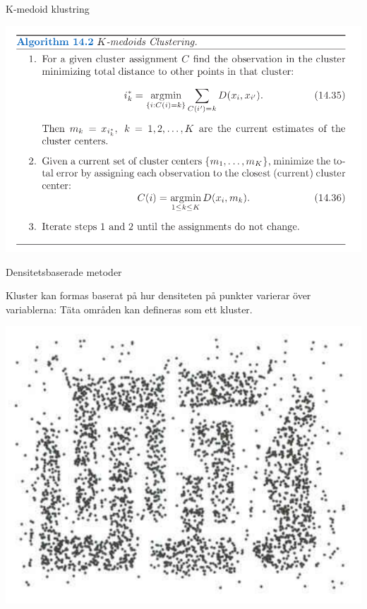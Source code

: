 \documentclass[10pt,english]{beamer}
\begin{document}
\begin{frame}{K-medoid klustring}

    \includegraphics[width = \textwidth]{figs/k-mediod.png}
    
\end{frame}



\begin{frame}{Densitetsbaserade metoder}

    Kluster kan formas baserat på hur densiteten på punkter varierar över variablerna: Täta områden kan defineras som ett kluster.

    \includegraphics[width = .8\textwidth]{figs/density_cluster2.png}
    
\end{frame}
\end{document}
